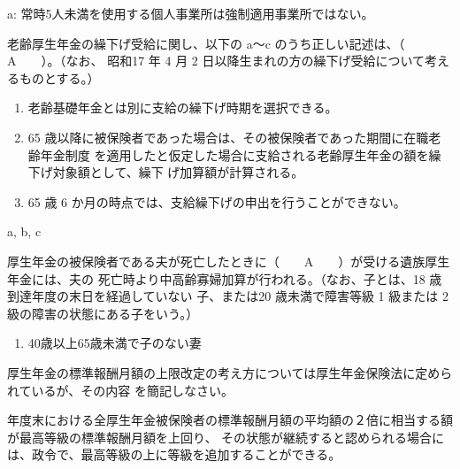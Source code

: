 \begin{explanationbox}
  a: 常時5人未満を使用する個人事業所は強制適用事業所ではない。
\end{explanationbox}


\begin{fillblank}[年金1 2018 問題1(4)\textcircled{5}]
老齢厚生年金の繰下げ受給に関し、以下の a～c のうち正しい記述は、（　　A　　）。（なお、
昭和17 年 4 月 2 日以降生まれの方の繰下げ受給について考えるものとする。）
  \begin{enumerate}[a ]
    \item 老齢基礎年金とは別に支給の繰下げ時期を選択できる。
    \item 65 歳以降に被保険者であった場合は、その被保険者であった期間に在職老齢年金制度
    を適用したと仮定した場合に支給される老齢厚生年金の額を繰下げ対象額として、繰下
    げ加算額が計算される。
    \item 65 歳 6 か月の時点では、支給繰下げの申出を行うことができない。
  \end{enumerate}

\end{fillblank}


\begin{answerbox}
  a, b, c
\end{answerbox}

\begin{fillblank}[年金1 2018 問題1(4)\textcircled{6}]
厚生年金の被保険者である夫が死亡したときに（　　A　　）が受ける遺族厚生年金には、夫の
死亡時より中高齢寡婦加算が行われる。（なお、子とは、18 歳到達年度の末日を経過していない
子、または20 歳未満で障害等級 1 級または 2 級の障害の状態にある子をいう。）
\end{fillblank}


\begin{answerbox}
  \begin{enumerate}[A: ]
    \item 40歳以上65歳未満で子のない妻
  \end{enumerate}
\end{answerbox}

\begin{shortanswer}[年金1 2018 問題2(5)\textcircled{2}]
  厚生年金の標準報酬月額の上限改定の考え方については厚生年金保険法に定められているが、その内容
を簡記しなさい。
\end{shortanswer}

\begin{answerbox}
  年度末における全厚生年金被保険者の標準報酬月額の平均額の２倍に相当する額が最高等級の標準報酬月額を上回り、
  その状態が継続すると認められる場合には、政令で、最高等級の上に等級を追加することができる。
\end{answerbox}

